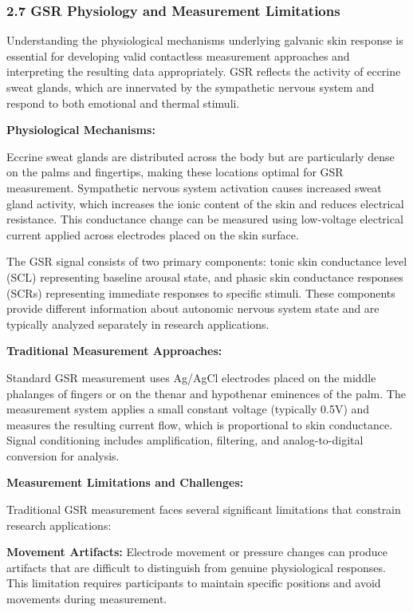 \documentclass[12pt,a4paper]{report}
\begin{document}
\subsubsection{2.7 GSR Physiology and Measurement Limitations}

Understanding the physiological mechanisms underlying galvanic skin response is essential for developing valid
contactless measurement approaches and interpreting the resulting data appropriately. GSR reflects the activity of
eccrine sweat glands, which are innervated by the sympathetic nervous system and respond to both emotional and thermal
stimuli.

\textbf{Physiological Mechanisms:}

Eccrine sweat glands are distributed across the body but are particularly dense on the palms and fingertips, making
these locations optimal for GSR measurement. Sympathetic nervous system activation causes increased sweat gland
activity, which increases the ionic content of the skin and reduces electrical resistance. This conductance change can
be measured using low-voltage electrical current applied across electrodes placed on the skin surface.

The GSR signal consists of two primary components: tonic skin conductance level (SCL) representing baseline arousal
state, and phasic skin conductance responses (SCRs) representing immediate responses to specific stimuli. These
components provide different information about autonomic nervous system state and are typically analyzed separately in
research applications.

\textbf{Traditional Measurement Approaches:}

Standard GSR measurement uses Ag/AgCl electrodes placed on the middle phalanges of fingers or on the thenar and
hypothenar eminences of the palm. The measurement system applies a small constant voltage (typically 0.5V) and measures
the resulting current flow, which is proportional to skin conductance. Signal conditioning includes amplification,
filtering, and analog-to-digital conversion for analysis.

\textbf{Measurement Limitations and Challenges:}

Traditional GSR measurement faces several significant limitations that constrain research applications:

\textbf{Movement Artifacts:} Electrode movement or pressure changes can produce artifacts that are difficult to distinguish
from genuine physiological responses. This limitation requires participants to maintain specific positions and avoid
movements during measurement.
\end{document}
